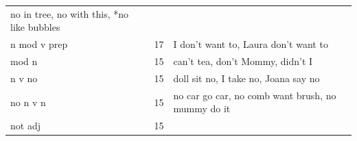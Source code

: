 \documentclass[man,floatsintext,draftall]{apa6}
\begin{document}
\begin{longtable}[]{@{}lll@{}}
\begin{minipage}[t]{0.47\columnwidth}
no in tree, no with this, *no like bubbles\strut
\end{minipage}\tabularnewline
\begin{minipage}[t]{0.23\columnwidth}\raggedright\strut
n mod v prep\strut
\end{minipage} & \begin{minipage}[t]{0.15\columnwidth}\raggedright\strut
17\strut
\end{minipage} & \begin{minipage}[t]{0.47\columnwidth}\raggedright\strut
I don't want to, Laura don't want to\strut
\end{minipage}\tabularnewline
\begin{minipage}[t]{0.23\columnwidth}\raggedright\strut
mod n\strut
\end{minipage} & \begin{minipage}[t]{0.15\columnwidth}\raggedright\strut
15\strut
\end{minipage} & \begin{minipage}[t]{0.47\columnwidth}\raggedright\strut
can't tea, don't Mommy, didn't I\strut
\end{minipage}\tabularnewline
\begin{minipage}[t]{0.23\columnwidth}\raggedright\strut
n v no\strut
\end{minipage} & \begin{minipage}[t]{0.15\columnwidth}\raggedright\strut
15\strut
\end{minipage} & \begin{minipage}[t]{0.47\columnwidth}\raggedright\strut
doll sit no, I take no, Joana say no\strut
\end{minipage}\tabularnewline
\begin{minipage}[t]{0.23\columnwidth}\raggedright\strut
no n v n\strut
\end{minipage} & \begin{minipage}[t]{0.15\columnwidth}\raggedright\strut
15\strut
\end{minipage} & \begin{minipage}[t]{0.47\columnwidth}\raggedright\strut
no car go car, no comb want brush, no mummy do it\strut
\end{minipage}\tabularnewline
\begin{minipage}[t]{0.23\columnwidth}\raggedright\strut
not adj\strut
\end{minipage} & \begin{minipage}[t]{0.15\columnwidth}\raggedright\strut
15\strut
\end{minipage} & \begin{minipage}[t]{0.47\columnwidth}\raggedright\strut

\end{minipage}
\end{longtable}
\end{document}
